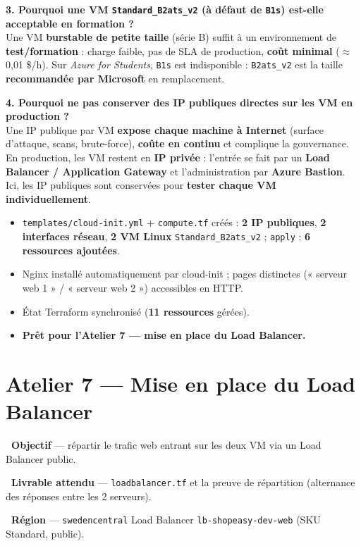 \documentclass[11pt,a4paper]{article}
\newcommand{\emo}[1]{\raisebox{-0.14em}{\twemoji{#1}}}
\newcommand{\eTarget}{\emo{1f3af}}
\newcommand{\ePackage}{\emo{1f4e6}}
\newcommand{\eGlobe}{\emo{1f310}}
\newcommand{\code}[1]{\texttt{#1}}
\begin{document}
\textbf{3. Pourquoi une VM \code{Standard\_B2ats\_v2} (à défaut de \code{B1s}) est-elle acceptable en
formation ?}\\
Une VM \textbf{burstable de petite taille} (série B) suffit à un environnement de \textbf{test/formation} :
charge faible, pas de SLA de production, \textbf{coût minimal} ($\approx$ 0,01 \$/h). Sur \textit{Azure for
Students}, \code{B1s} est indisponible : \code{B2ats\_v2} est la taille \textbf{recommandée par Microsoft} en
remplacement.

\textbf{4. Pourquoi ne pas conserver des IP publiques directes sur les VM en production ?}\\
Une IP publique par VM \textbf{expose chaque machine à Internet} (surface d'attaque, scans, brute-force),
\textbf{coûte en continu} et complique la gouvernance. En production, les VM restent en \textbf{IP privée} :
l'entrée se fait par un \textbf{Load Balancer / Application Gateway} et l'administration par \textbf{Azure
Bastion}. Ici, les IP publiques sont conservées pour \textbf{tester chaque VM individuellement}.

\begin{etatbox}
\begin{itemize}
  \item \code{templates/cloud-init.yml} + \code{compute.tf} créés : \textbf{2 IP publiques}, \textbf{2 interfaces réseau}, \textbf{2 VM Linux} \code{Standard\_B2ats\_v2} ; \code{apply} : \textbf{6 ressources ajoutées}.
  \item Nginx installé automatiquement par cloud-init ; pages distinctes (« serveur web 1 » / « serveur web 2 ») accessibles en HTTP.
  \item État Terraform synchronisé (\textbf{11 ressources} gérées).
  \item \textbf{Prêt pour l'Atelier 7 — mise en place du Load Balancer.}
\end{itemize}
\end{etatbox}

\section{Atelier 7 — Mise en place du Load Balancer}

\begin{fiche}
\textbf{\eTarget~Objectif} — répartir le trafic web entrant sur les deux VM via un Load Balancer public.

\textbf{\ePackage~Livrable attendu} — \code{loadbalancer.tf} et la preuve de répartition (alternance des réponses entre les 2 serveurs).

\textbf{\eGlobe~Région} — \code{swedencentral} \quad\textbullet\quad Load Balancer \code{lb-shopeasy-dev-web} (SKU Standard, public).
\end{fiche}
\end{document}
